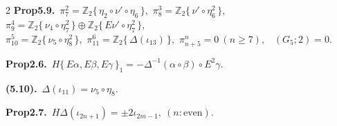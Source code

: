 \documentclass[10pt, leqno]{ltjsarticle}
\newcommand{\todai}[2][]{\{\,#2\,\}_{#1}}      %
\newcommand{\gen}[1]{\{\,#1\,\}}       %
\numberwithin{equation}{section}
\theoremstyle{plain}
\theoremstyle{definition}
\theoremstyle{remark}
\begin{document}
\begin{paracol}{2}
\noindent
\textbf{Prop5.9.}\
\(\pi^{2}_{7}=\mathbb Z_2\gen{\eta_{2}\circ\nu'\circ\eta_6},\) \quad
\(\pi^{3}_{8}=\mathbb Z_2\gen{\nu'\circ\eta_6^2},\) \quad
\(\pi^{4}_{9}=\mathbb Z_2\gen{\nu_{4}\circ\eta_7^2}\oplus \mathbb Z_2\gen{E\nu'\circ\eta_7^2},\) \\
\(\pi^{5}_{10}=\mathbb Z_2\gen{\nu_{5}\circ\eta_8^2},\) \quad
\(\pi^{6}_{11}=\mathbb Z_2\gen{\Delta(\iota_{13})},\) \quad
\(\pi^{n}_{n+5}=0\ (n\ge7),\) \
\((G_{5};2)=0.\)

\noindent
\textbf{Prop2.6.}\
\(H\todai[1]{E\alpha, E\beta, E\gamma} 
= -\Delta^{-1}(\alpha\circ\beta)\circ E^2\gamma.\)

\noindent
\textbf{(5.10).}\
\(\Delta(\iota_{11})=\nu_5\circ\eta_8 .\)

\noindent
\textbf{Prop2.7.}\
\(H\Delta(\iota_{2n+1}) = \pm2\iota_{2m-1},\ (n:\text{even})\).







\end{paracol}
\end{document}
